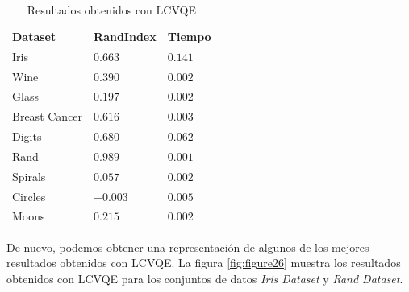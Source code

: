 \begin{table}[!h]
	\centering
	\setlength{\arrayrulewidth}{1mm}
	\setlength{\tabcolsep}{10pt}
	\renewcommand{\arraystretch}{0.9}
	
	\begin{tabular}{ >{\centering\arraybackslash}m{2.5cm}  >{\centering\arraybackslash}m{1.8cm}>{\centering\arraybackslash}m{1.5cm}}
		\hline
		\rowcolor{black}
		\multicolumn{3}{c}{\bf \color{white}{Resultados obtenidos con LCVQE}}\\
		\hline
		\rowcolor{gray!50}
		\textbf{Dataset} & \textbf{RandIndex} & \textbf{Tiempo}  \\
		Iris & $0.663$ & $0.141$  \\
		Wine & $0.390$ & $0.002$  \\
		Glass & $0.197$ & $0.002$  \\
		Breast Cancer & $0.616$ & $0.003$  \\
		Digits & $0.680$ & $0.062$  \\
		Rand & $0.989$ & $0.001$  \\
		Spirals & $0.057$ & $0.002$  \\
		Circles & $-0.003$ & $0.005$  \\
		Moons & $0.215$ & $0.002$  \\
		\hline
		
	\end{tabular}
	\caption{Resultados obtenidos con \acs{LCVQE}}
	\label{tab:tabla9}
\end{table}

De nuevo, podemos obtener una representación de algunos de los mejores resultados obtenidos con \acs{LCVQE}. La figura \ref{fig:figure26} muestra los resultados obtenidos con \acs{LCVQE} para los conjuntos de datos \textit{Iris Dataset} y \textit{Rand Dataset}. 


